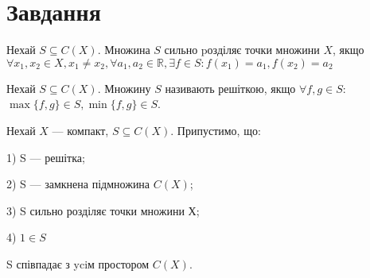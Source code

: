 
\chapter{Завдання \theHchapter}

\begin{tcolorbox}[title=Означення 1]
    Нехай $S \subseteq C(X)$. 
    Множина $S$ сильно pозділяє точки множини $X$, якщо
    $\forall x_1, x_2 \in X, x_1 \neq x_2, \forall a_1, a_2 \in \mathbb{R},
    \exists f \in S: f(x_1) = a_1, f(x_2) = a_2$
\end{tcolorbox}

\begin{tcolorbox}[title=Означення 2]
    Нехай $S \subseteq C(X)$. Множину $S$ називають решіткою, 
    якщо $\forall f, g \in S$:
    $\max\{f,g\} \in S, \min\{f,g\} \in S$.
\end{tcolorbox}


\begin{tcolorbox}[title=теорема Какутанi–Крейна.]
    Нехай $X$ — компакт, $S \subseteq C(X)$. Припустимо, що:


    1) S — решітка;
    
    
    2) S — замкнена підмножина $C(X)$;
    
    
    3) S сильно розділяє точки множини Х;
    
    
    4) $1 \in S$
    
    
    S співпадає з yciм простором $C(X)$.
\end{tcolorbox}

